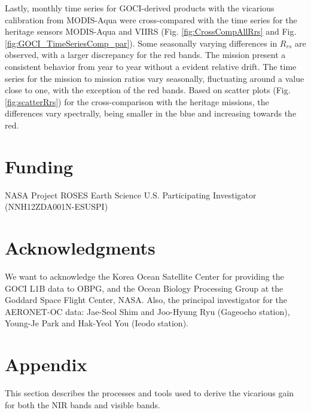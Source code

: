 \documentclass[10pt]{article}
\begin{document}
Lastly, monthly time series for GOCI-derived products with the vicarious calibration from MODIS-Aqua were cross-compared with the time series for the heritage sensors MODIS-Aqua and VIIRS (Fig. \ref{fig:CrossCompAllRrs} and Fig. \ref{fig:GOCI_TimeSeriesComp_par}).
Some seasonally varying differences in $R_{rs}$ are observed, with a larger discrepancy for the red bands. 
The mission present a consistent behavior from year to year without a evident relative drift.
The time series for the mission to mission ratios vary seasonally, fluctuating around a value close to one, with the exception of the red bands.
Based on scatter plots (Fig. \ref{fig:scatterRrs}) for the cross-comparison with the heritage missions, the differences vary spectrally, being smaller in the blue and increasing towards the red. 


\section*{Funding}
NASA Project ROSES Earth Science U.S. Participating Investigator (NNH12ZDA001N-ESUSPI)
\section*{Acknowledgments}
We want to acknowledge the Korea Ocean Satellite Center for providing the GOCI L1B data to OBPG, and the Ocean Biology Processing Group at the Goddard Space Flight Center, NASA. Also, the principal investigator for the AERONET-OC data: Jae-Seol Shim and Joo-Hyung Ryu (Gageocho station), Young-Je Park and Hak-Yeol You (Ieodo station).


\appendix
\section*{Appendix}
This section describes the processes and tools used to derive the vicarious gain for both the NIR bands and visible bands.
\end{document}
